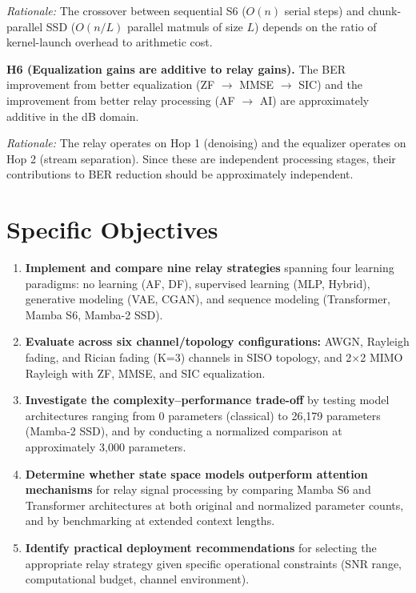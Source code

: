 \documentclass[
  english,
  12pt,
  12pt,
  a4paper,
  oneside]{report}
\begin{document}
\emph{Rationale:} The crossover between sequential S6 (\(O(n)\) serial steps) and chunk-parallel SSD (\(O(n/L)\) parallel matmuls of size \(L\)) depends on the ratio of kernel-launch overhead to arithmetic cost.

\textbf{H6 (Equalization gains are additive to relay gains).} The BER improvement from better equalization (ZF \(\to\) MMSE \(\to\) SIC) and the improvement from better relay processing (AF \(\to\) AI) are approximately additive in the dB domain.

\emph{Rationale:} The relay operates on Hop 1 (denoising) and the equalizer operates on Hop 2 (stream separation). Since these are independent processing stages, their contributions to BER reduction should be approximately independent.

\section{Specific Objectives}\label{sec:specific-objectives}

\begin{enumerate}
\def\labelenumi{\arabic{enumi}.}
\item
  \textbf{Implement and compare nine relay strategies} spanning four learning paradigms: no learning (AF, DF), supervised learning (MLP, Hybrid), generative modeling (VAE, CGAN), and sequence modeling (Transformer, Mamba S6, Mamba-2 SSD).
\item
  \textbf{Evaluate across six channel/topology configurations:} AWGN, Rayleigh fading, and Rician fading (K=3) channels in SISO topology, and 2×2 MIMO Rayleigh with ZF, MMSE, and SIC equalization.
\item
  \textbf{Investigate the complexity--performance trade-off} by testing model architectures ranging from 0 parameters (classical) to 26,179 parameters (Mamba-2 SSD), and by conducting a normalized comparison at approximately 3,000 parameters.
\item
  \textbf{Determine whether state space models outperform attention mechanisms} for relay signal processing by comparing Mamba S6 and Transformer architectures at both original and normalized parameter counts, and by benchmarking at extended context lengths.
\item
  \textbf{Identify practical deployment recommendations} for selecting the appropriate relay strategy given specific operational constraints (SNR range, computational budget, channel environment).
\end{enumerate}
\end{document}
